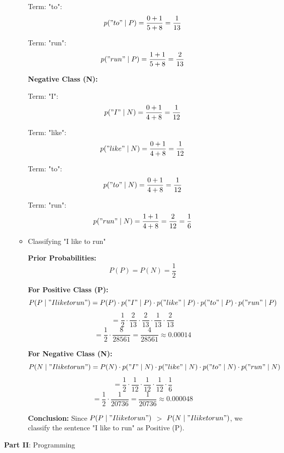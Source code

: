 \documentclass[12pt]{article}
\begin{document}
\begin{enumerate}[leftmargin=\labelsep, label=\textbf{\arabic*.)}]
\begin{itemize}
                    Term: "to":
                    \[
                        p("to" \mid P) = \frac{0 + 1}{5 + 8} = \frac{1}{13}
                    \]

                    Term: "run":
                    \[
                        p("run" \mid P) = \frac{1 + 1}{5 + 8} = \frac{2}{13}
                    \]

                    \textbf{Negative Class (N):}

                    Term: "I":
                    \[
                        p("I" \mid N) = \frac{0 + 1}{4 + 8} = \frac{1}{12}
                    \]

                    Term: "like":
                    \[
                        p("like" \mid N) = \frac{0 + 1}{4 + 8} = \frac{1}{12}
                    \]

                    Term: "to":
                    \[
                        p("to" \mid N) = \frac{0 + 1}{4 + 8} = \frac{1}{12}
                    \]

                    Term: "run":
                    \[
                        p("run" \mid N) = \frac{1 + 1}{4 + 8} = \frac{2}{12} = \frac{1}{6}
                    \]

              \item Classifying "I like to run"

                    \textbf{Prior Probabilities:}
                    \[
                        P(P) = P(N) = \frac{1}{2}
                    \]

                    \textbf{For Positive Class (P):}
                    \[
                        P(P \mid "I like to run") = P(P) \cdot p("I" \mid P) \cdot p("like" \mid P) \cdot p("to" \mid P) \cdot p("run" \mid P)
                    \]
                    \[
                        = \frac{1}{2} \cdot \frac{2}{13} \cdot \frac{2}{13} \cdot \frac{1}{13} \cdot \frac{2}{13}
                    \]
                    \[
                        = \frac{1}{2} \cdot \frac{8}{28561} = \frac{4}{28561} \approx 0.00014
                    \]

                    \textbf{For Negative Class (N):}
                    \[
                        P(N \mid "I like to run") = P(N) \cdot p("I" \mid N) \cdot p("like" \mid N) \cdot p("to" \mid N) \cdot p("run" \mid N)
                    \]
                    \[
                        = \frac{1}{2} \cdot \frac{1}{12} \cdot \frac{1}{12} \cdot \frac{1}{12} \cdot \frac{1}{6}
                    \]
                    \[
                        = \frac{1}{2} \cdot \frac{1}{20736} = \frac{1}{20736} \approx 0.000048
                    \]

                    \textbf{Conclusion:}
                    Since \( P(P \mid "I like to run") \) \(>\) \( P(N \mid "I like to run") \), we classify the sentence "I like to run" as Positive (P).

          \end{itemize}
\end{enumerate}
\large{\textbf{Part II}: Programming}\normalsize
\end{document}
